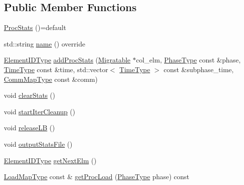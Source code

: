 \subsection*{Public Member Functions}
\begin{DoxyCompactItemize}
\item 
\hyperlink{structvt_1_1vrt_1_1collection_1_1balance_1_1_proc_stats_aa3495f8e610964b594e6dc4d3998d5b2}{Proc\+Stats} ()=default
\item 
std\+::string \hyperlink{structvt_1_1vrt_1_1collection_1_1balance_1_1_proc_stats_a19a950a19ad62c0dddff07d50d060114}{name} () override
\item 
\hyperlink{namespacevt_1_1vrt_1_1collection_1_1balance_a14c8d2c972f2913aa3f1636e5be0a120}{Element\+I\+D\+Type} \hyperlink{structvt_1_1vrt_1_1collection_1_1balance_1_1_proc_stats_a21164188d5d1d09724959e95e5c4f2e4}{add\+Proc\+Stats} (\hyperlink{structvt_1_1vrt_1_1collection_1_1_migratable}{Migratable} $\ast$col\+\_\+elm, \hyperlink{namespacevt_a46ce6733d5cdbd735d561b7b4029f6d7}{Phase\+Type} const \&phase, \hyperlink{namespacevt_a876a9d0cd5a952859c72de8a46881442}{Time\+Type} const \&time, std\+::vector$<$ \hyperlink{namespacevt_a876a9d0cd5a952859c72de8a46881442}{Time\+Type} $>$ const \&subphase\+\_\+time, \hyperlink{namespacevt_1_1vrt_1_1collection_1_1balance_aa50d4cbbfa3c643e7303fc6e08f411fb}{Comm\+Map\+Type} const \&comm)
\item 
void \hyperlink{structvt_1_1vrt_1_1collection_1_1balance_1_1_proc_stats_a9a47e5d00d2645f76f2a21e75996fe8b}{clear\+Stats} ()
\item 
void \hyperlink{structvt_1_1vrt_1_1collection_1_1balance_1_1_proc_stats_a6b8af21b777599060c4a532a5adb0100}{start\+Iter\+Cleanup} ()
\item 
void \hyperlink{structvt_1_1vrt_1_1collection_1_1balance_1_1_proc_stats_a7865efba4c984b1b77a93b5cd04dc861}{release\+LB} ()
\item 
void \hyperlink{structvt_1_1vrt_1_1collection_1_1balance_1_1_proc_stats_a543211533c1c2c348137069e945432a5}{output\+Stats\+File} ()
\item 
\hyperlink{namespacevt_1_1vrt_1_1collection_1_1balance_a14c8d2c972f2913aa3f1636e5be0a120}{Element\+I\+D\+Type} \hyperlink{structvt_1_1vrt_1_1collection_1_1balance_1_1_proc_stats_aff0ecd6f0016ebd074b982caad107806}{get\+Next\+Elm} ()
\item 
\hyperlink{structvt_1_1vrt_1_1collection_1_1balance_1_1_proc_stats_aa810fd21680061ec5d50f6526f66be31}{Load\+Map\+Type} const  \& \hyperlink{structvt_1_1vrt_1_1collection_1_1balance_1_1_proc_stats_a58efd15cd33db3c5ce9ba8677feb486b}{get\+Proc\+Load} (\hyperlink{namespacevt_a46ce6733d5cdbd735d561b7b4029f6d7}{Phase\+Type} phase) const

\end{DoxyCompactItemize}
